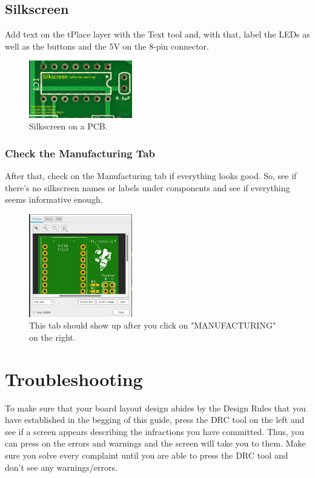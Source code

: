 \documentclass{article}
\begin{document}
\subsection{Silkscreen}
Add text on the tPlace layer with the Text tool and, with that, label the LEDs as well as the buttons and the 5V on the 8-pin connector.  
\begin{figure}[ht]
	\center
	\includegraphics[width=0.4\textwidth, keepaspectratio]{images/silk.png}
	\caption{Silkscreen on a PCB.}
	\label{fig:silkscreen}
\end{figure}
\pagebreak
\subsubsection{Check the Manufacturing Tab}
After that, check on the Manufacturing tab if everything looks good. So, see if there's no silkscreen names or labels under components and see if everything seems informative enough.
\begin{figure}[ht]
	\center
	\includegraphics[width=0.4\textwidth, keepaspectratio]{images/manufac.png}
	\caption{This tab should show up after you click on "MANUFACTURING" on the right.}
	\label{fig:manufac}
\end{figure}

\section{Troubleshooting}
To make sure that your board layout design abides by the Design Rules that you have established in the begging of this guide, press the DRC tool on the left and see if a screen appears describing the infractions you have committed. Thus, you can press on the errors and warnings and the screen will take you to them. Make sure you solve every complaint until you are able to press the DRC tool and don't see any warnings/errors.
\end{document}
